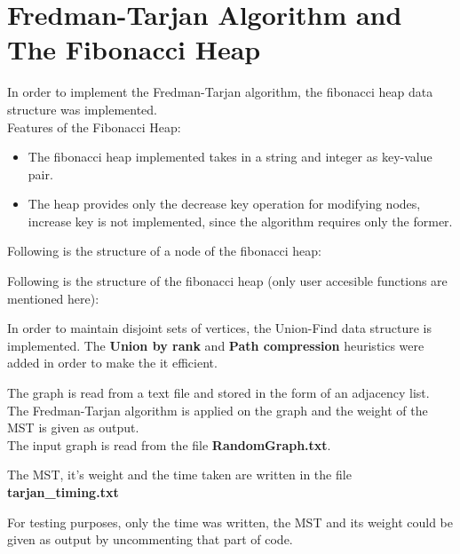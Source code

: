 \documentclass[]{article}
\begin{document}
\section{Fredman-Tarjan Algorithm and The Fibonacci Heap}
\begin{flushleft}
	In order to implement the Fredman-Tarjan algorithm, the fibonacci heap data structure was implemented.\\
	Features of the Fibonacci Heap:
	\begin{itemize}
	\item The fibonacci heap implemented takes in a string and integer as key-value pair.
	\item The heap provides only the decrease key operation for modifying nodes, increase key is not implemented, since the algorithm requires only the former. 
	\end{itemize}
	Following is the structure of a node of the fibonacci heap:
	
		
	\vspace{10px}	
	Following is the structure of the fibonacci heap (only user accesible functions are mentioned here):	

		
	\vspace{10px}	
	In order to maintain disjoint sets of vertices, the Union-Find data structure is implemented. The \textbf{Union by rank} and \textbf{Path compression} heuristics were added in order to make the it efficient.
	

	The graph is read from a text file and stored in the form of an adjacency list. The Fredman-Tarjan algorithm is applied on the graph and the weight of the MST is given as output.\\
	\vspace{10px}
	The input graph is read from the file \textbf{RandomGraph.txt}.
	
	The MST, it's weight and the time taken are written in the file \textbf{tarjan\_timing.txt}
	
	For testing purposes, only the time was written, the MST and its weight could be given as output by uncommenting that part of code.  
	
\end{flushleft} 
\end{document}
